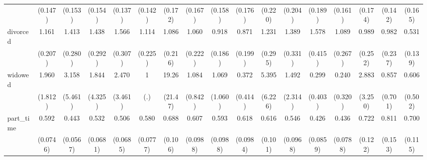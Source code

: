 {\begin{tabular}{l*{16}{c}}
                    &     (0.147)         &     (0.153)         &     (0.154)         &     (0.137)         &     (0.142)         &     (0.172)         &     (0.167)         &     (0.158)         &     (0.176)         &     (0.220)         &     (0.204)         &     (0.189)         &     (0.161)         &     (0.174)         &     (0.142)         &     (0.165)         \\
[1em]
divorced            &       1.161         &       1.413         &       1.438         &       1.566\sym{*}  &       1.114         &       1.086         &       1.060         &       0.918         &       0.871         &       1.231         &       1.389         &       1.578         &       1.089         &       0.989         &       0.982         &       0.531\sym{*}  \\
                    &     (0.207)         &     (0.280)         &     (0.292)         &     (0.307)         &     (0.225)         &     (0.216)         &     (0.222)         &     (0.186)         &     (0.199)         &     (0.295)         &     (0.331)         &     (0.415)         &     (0.267)         &     (0.252)         &     (0.237)         &     (0.139)         \\
[1em]
widowed             &       1.960         &       3.158         &       1.844         &       2.470         &           1         &       19.26\sym{**} &       1.084         &       1.069         &       0.372         &       5.395         &       1.492         &       0.299         &       0.240         &       2.883         &       0.857         &       0.606         \\
                    &     (1.812)         &     (5.461)         &     (4.325)         &     (3.461)         &         (.)         &     (21.47)         &     (0.842)         &     (1.060)         &     (0.414)         &     (6.226)         &     (2.314)         &     (0.403)         &     (0.320)         &     (3.250)         &     (0.701)         &     (0.502)         \\
[1em]
part\_time           &       0.592\sym{***}&       0.443\sym{***}&       0.532\sym{***}&       0.506\sym{***}&       0.580\sym{***}&       0.688\sym{*}  &       0.607\sym{**} &       0.593\sym{**} &       0.618\sym{**} &       0.616\sym{**} &       0.546\sym{***}&       0.426\sym{***}&       0.436\sym{***}&       0.722         &       0.811         &       0.700\sym{*}  \\
                    &    (0.0746)         &    (0.0567)         &    (0.0681)         &    (0.0685)         &    (0.0777)         &     (0.106)         &    (0.0988)         &    (0.0988)         &    (0.0984)         &     (0.101)         &    (0.0968)         &    (0.0859)         &    (0.0788)         &     (0.122)         &     (0.153)         &     (0.115)         \\

\end{tabular}}
